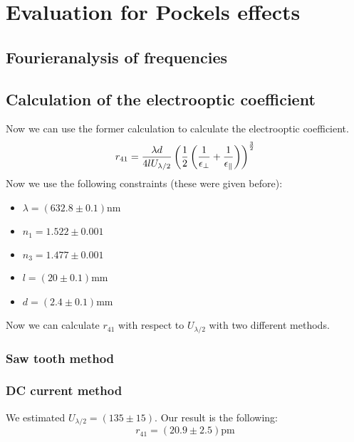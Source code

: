 \section{Evaluation for Pockels effects}
\subsection{Fourieranalysis of frequencies}
\subsection{Calculation of the electrooptic coefficient}
Now we can use the former calculation to calculate the electrooptic coefficient.
\begin{equation}
    r_{41} = \frac{\lambda d}{4 l U_{\lambda / 2}} 
    \left(\frac{1}{2} \left(\frac{1}{\epsilon_\perp} + \frac{1}{\epsilon_\parallel}\right)\right)^{\frac{3}{2}}
    \label{eq:r_41_U}
\end{equation}
Now we use the following constraints (these were given before):
\begin{itemize}
\setlength\itemsep{0em}
\item[] $\lambda = (632.8\pm 0.1)$nm
\item[] $n_1     = 1.522\pm 0.001$
\item[] $n_3     = 1.477\pm 0.001$
\item[] $l       = ( 20\pm 0.1)$mm
\item[] $d       = (2.4\pm 0.1)$mm
\end{itemize}
Now we can calculate $r_{41}$ with respect to $U_{\lambda/2}$ with two different methods.
\subsubsection{Saw tooth method}
\label{ssub:Saw tooth method}

\subsubsection{DC current method}
\label{ssub:DC current method}
We estimated $U_{\lambda/2}    = (135  \pm 15)$.
Our result is the following: 
\begin{equation*}
r_{41} = \left (20.9 \pm 2.5 \right )  \mathrm{pm}
\end{equation*}
